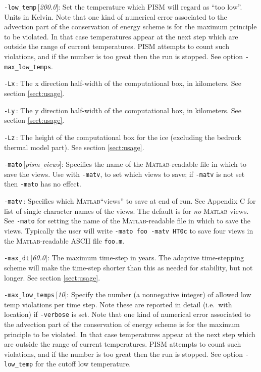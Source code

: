 \documentclass[11pt,final]{amsart}
\newcommand{\Matlab}{\textsc{Matlab}\xspace}
\newcommand{\rawopt}[1]{\vspace{1mm}\noindent \large\texttt{-#1}\normalsize}
\newcommand{\opt}[1]{\rawopt{#1}\,:\quad}
\newcommand{\optdef}[2]{\rawopt{#1}\,[\textsl{#2}]:\quad}
\newcommand{\und}{$\underline{\,\,\,}$}
\begin{document}
\optdef{low\und temp}{200.0}  Set the temperature which PISM will regard as ``too low''.  Units in Kelvin.  Note that one kind of numerical error associated to the advection part of the conservation of energy scheme is for the maximum principle to be violated.  In that case temperatures appear at the next step which are outside the range of current temperatures.  PISM attempts to count such violations, and if the number is too great then the run is stopped.  See option \verb|-max_low_temps|.

\opt{Lx}  The x direction half-width of the computational box, in kilometers.  See section \ref{sect:usage}.

\opt{Ly}  The y direction half-width of the computational box, in kilometers.  See section \ref{sect:usage}.

\opt{Lz}  The height of the computational box for the ice (excluding the bedrock thermal model part).  See section \ref{sect:usage}.

\optdef{mato}{pism\und views}  Specifies the name of the \Matlab-readable file in which to save the views.  Use with \verb|-matv|, to set which views to save; if \verb|-matv| is not set then \verb|-mato| has no effect.

\opt{matv}  Specifies which \Matlab ``views'' to save at end of run.  See Appendix C for list of single character names of the views.  The default is for \emph{no} \Matlab views.  See \verb|-mato| for setting the name of the \Matlab-readable file in which to save the views.  Typically the user will write \verb|-mato foo -matv HT0c| to save four views in the \Matlab-readable ASCII file \verb|foo.m|.

\optdef{max\und dt}{60.0}  The maximum time-step in years.  The adaptive time-stepping scheme will make the time-step shorter than this as needed for stability, but not longer.  See section \ref{sect:usage}.

\optdef{max\und low\und temps}{10}  Specify the number (a nonnegative integer) of allowed low temp violations per time step.  Note these are reported in detail (i.e.~with location) if \verb|-verbose| is set.  Note that one kind of numerical error associated to the advection part of the conservation of energy scheme is for the maximum principle to be violated.  In that case temperatures appear at the next step which are outside the range of current temperatures.  PISM attempts to count such violations, and if the number is too great then the run is stopped.  See option \verb|-low_temp| for the cutoff low temperature.
\end{document}
